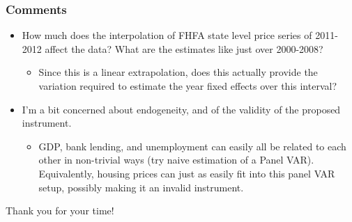 \documentclass{beamer}
\begin{document}
\begin{frame}
\frametitle{Comments}
\begin{itemize}
\item How much does the interpolation of FHFA state level price series of 2011-2012 affect the data? What are the estimates like just over 2000-2008?
\begin{itemize}
\item Since this is a linear extrapolation, does this actually provide the variation required to estimate the year fixed effects over this interval?
\end{itemize}
\item I'm a bit concerned about endogeneity, and of the validity of the proposed instrument. 
\begin{itemize}
\item GDP, bank lending, and unemployment can easily all be related to each other in non-trivial ways (try naive estimation of a Panel VAR). Equivalently, housing prices can just as easily fit into this panel VAR setup, possibly making it an invalid instrument.
\end{itemize}
\end{itemize}
\end{frame}

\begin{frame}
\centering
\huge{Thank you for your time!}
\end{frame}
\end{document}
